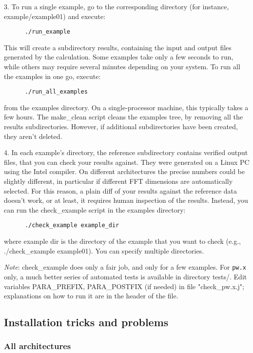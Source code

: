 \documentclass[12pt,a4paper]{article}
\def\pw.x{\texttt{pw.x}}
\begin{document}
3. To run a single example, go to the corresponding directory (for
   instance, example/example01) and execute: 
\begin{verbatim}
      ./run_example
\end{verbatim}
This will create a subdirectory results, containing the input and
output files generated by the calculation. Some examples take only a
few seconds to run, while others may require several minutes depending
on your system. To run all the examples in one go, execute:
\begin{verbatim}
      ./run_all_examples
\end{verbatim}
from the examples directory. On a single-processor machine, this
typically takes a few hours. The make\_clean script cleans the
examples tree, by removing all the results subdirectories. However, if
additional subdirectories have been created, they aren't deleted. 

4. In each example's directory, the reference subdirectory contains
verified output files, that you can check your results against. They
were generated on a Linux PC using the Intel compiler. On different
architectures the precise numbers could be slightly different, in
particular if different FFT dimensions are automatically selected. For
this reason, a plain diff of your results against the reference data
doesn't work, or at least, it requires human inspection of the
results. Instead, you can run the  
check\_example script in the examples directory:
\begin{verbatim}
      ./check_example example_dir
\end{verbatim}
where example dir is the directory of the example that you want to
check (e.g., ./check\_example example01). You can specify multiple
directories.  

{\em Note}: check\_example does only a fair job, and only for a few examples. 
For \pw.x only, a much better series of automated tests is available in
directory tests/. Edit variables PARA\_PREFIX, PARA\_POSTFIX (if
needed) in file "check\_pw.x.j"; explanations on how to run it 
are in the header of the file.

\subsection{Installation tricks and problems}

\subsubsection{All architectures}
\end{document}

